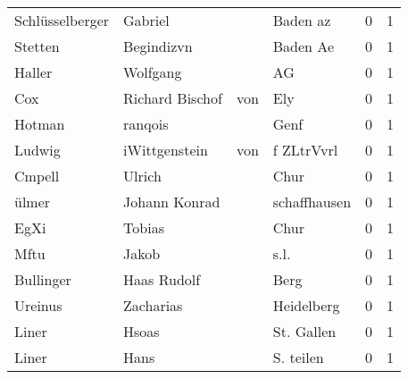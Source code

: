 \begin{center}
\begin{tiny}
\begin{longtabu}{llllrr}
          Schlüsselberger &                            Gabriel &             &                                    Baden az &          0 &         1 \\
                  Stetten &                         Begindizvn &             &                                    Baden Ae &          0 &         1 \\
                   Haller &                           Wolfgang &             &                                          AG &          0 &         1 \\
                      Cox &                    Richard Bischof &         von &                                         Ely &          0 &         1 \\
                   Hotman &                            ranqois &             &                                        Genf &          0 &         1 \\
                   Ludwig &                      iWittgenstein &         von &                                  f ZLtrVvrl &          0 &         1 \\
                   Cmpell &                             Ulrich &             &                                        Chur &          0 &         1 \\
                    ülmer &                      Johann Konrad &             &                                schaffhausen &          0 &         1 \\
                     EgXi &                             Tobias &             &                                        Chur &          0 &         1 \\
                     Mftu &                              Jakob &             &                                        s.l. &          0 &         1 \\
                Bullinger &                        Haas Rudolf &             &                                        Berg &          0 &         1 \\
                  Ureinus &                          Zacharias &             &                                  Heidelberg &          0 &         1 \\
                    Liner &                              Hsoas &             &                                  St. Gallen &          0 &         1 \\
                    Liner &                               Hans &             &                                   S. teilen &          0 &         1 \\

\end{longtabu}
\end{tiny}
\end{center}
